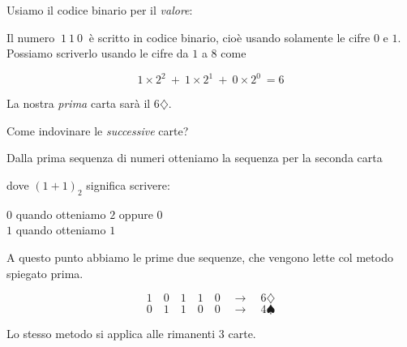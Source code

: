 \documentclass[8pt]{beamer}
\theoremstyle{plain}
\theoremstyle{definition}
\begin{document}
\begin{frame}
\begin{center}
Usiamo il codice binario per il \textit{valore}:

\bigskip
\bigskip

Il numero $\: 1\: 1\: 0\:$ è scritto in codice binario, cioè usando solamente le cifre $0$ e $1$. \\Possiamo scriverlo usando le cifre da $1$ a $8$ come

$$1 \times 2^{2} \: + \: 1\times 2^{1} \: + \: 0\times 2^{0} \:= 6$$

\bigskip
\bigskip

La nostra \textit{prima} carta sarà il 6$\diamondsuit$.
\end{center}
\end{frame}


\begin{frame}
\begin{center}
Come indovinare le \textit{successive} carte?

\bigskip
\bigskip

Dalla prima sequenza di numeri otteniamo la sequenza per la seconda carta

\smallskip


\medskip

dove $(1+1)_{2}$ significa scrivere:

\smallskip
 $0$ quando otteniamo $2$ oppure $0$ \\$1$ quando otteniamo $1$
% 
% 
\end{center}
\end{frame}


\begin{frame}
\begin{center}
A questo punto abbiamo le prime due sequenze, che vengono lette col metodo spiegato prima.

\bigskip

$$1\quad 0\quad 1\quad 1\quad 0\quad \rightarrow \quad 6\diamondsuit $$
$$0\quad 1\quad 1\quad 0\quad 0\quad \rightarrow \quad 4\spadesuit $$

\bigskip

Lo stesso metodo si applica alle rimanenti 3 carte.

\end{center}
\end{frame}
\end{document}
